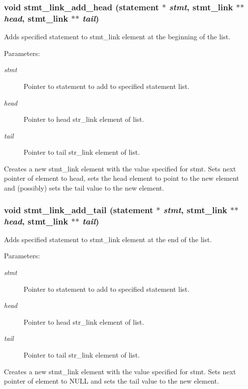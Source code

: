 \subsubsection{\setlength{\rightskip}{0pt plus 5cm}void stmt\_\-link\_\-add\_\-head ({\bf statement} $\ast$ {\em stmt}, {\bf stmt\_\-link} $\ast$$\ast$ {\em head}, {\bf stmt\_\-link} $\ast$$\ast$ {\em tail})}\label{link_8c_a1}


Adds specified statement to stmt\_\-link element at the beginning of the list.

\begin{Desc}
\item[Parameters:]
\begin{description}
\item[{\em stmt}]Pointer to statement to add to specified statement list. \item[{\em head}]Pointer to head str\_\-link element of list. \item[{\em tail}]Pointer to tail str\_\-link element of list.\end{description}
\end{Desc}
Creates a new stmt\_\-link element with the value specified for stmt. Sets next pointer of element to head, sets the head element to point to the new element and (possibly) sets the tail value to the new element. 
\subsubsection{\setlength{\rightskip}{0pt plus 5cm}void stmt\_\-link\_\-add\_\-tail ({\bf statement} $\ast$ {\em stmt}, {\bf stmt\_\-link} $\ast$$\ast$ {\em head}, {\bf stmt\_\-link} $\ast$$\ast$ {\em tail})}\label{link_8c_a2}


Adds specified statement to stmt\_\-link element at the end of the list.

\begin{Desc}
\item[Parameters:]
\begin{description}
\item[{\em stmt}]Pointer to statement to add to specified statement list. \item[{\em head}]Pointer to head str\_\-link element of list. \item[{\em tail}]Pointer to tail str\_\-link element of list.\end{description}
\end{Desc}
Creates a new stmt\_\-link element with the value specified for stmt. Sets next pointer of element to NULL and sets the tail value to the new element. 
